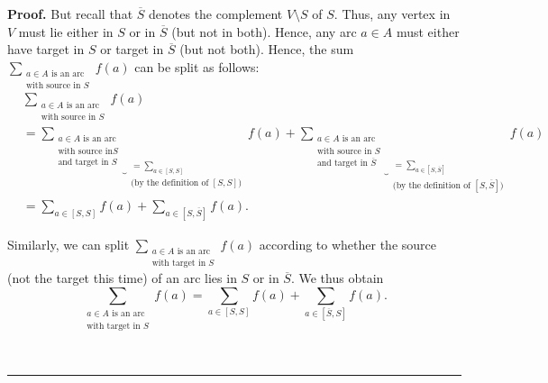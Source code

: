 \documentclass[numbers=enddot,12pt,final,onecolumn,notitlepage]{scrartcl}%
\theoremstyle{definition}
\newenvironment{proof}[1][Proof]{\noindent\textbf{#1.} }{\ \rule{0.5em}{0.5em}}
\let\sumnonlimits\sum
\renewcommand{\sum}{\sumnonlimits\limits}
\begin{document}
\begin{proof}
But recall that $\overline{S}$ denotes the complement $V\setminus S$ of $S$.
Thus, any vertex in $V$ must lie either in $S$ or in $\overline{S}$ (but not
in both). Hence, any arc $a\in A$ must either have target in $S$ or target in
$\overline{S}$ (but not both). Hence, the sum $\sum_{\substack{a\in A\text{ is
an arc}\\\text{with source in }S}}f\left(  a\right)  $ can be split as
follows:
\begin{align}
&  \sum_{\substack{a\in A\text{ is an arc}\\\text{with source in }S}}f\left(
a\right) \nonumber\\
&  =\underbrace{\sum_{\substack{a\in A\text{ is an arc}\\\text{with source in
}S\\\text{and target in }S}}}_{\substack{=\sum_{a\in\left[  S,S\right]
}\\\text{(by the definition of }\left[  S,S\right]  \text{)}}}f\left(
a\right)  +\underbrace{\sum_{\substack{a\in A\text{ is an arc}\\\text{with
source in }S\\\text{and target in }\overline{S}}}}_{\substack{=\sum
_{a\in\left[  S,\overline{S}\right]  }\\\text{(by the definition of }\left[
S,\overline{S}\right]  \text{)}}}f\left(  a\right) \nonumber\\
&  =\sum_{a\in\left[  S,S\right]  }f\left(  a\right)  +\sum_{a\in\left[
S,\overline{S}\right]  }f\left(  a\right)  . \label{pf.prop.2.a.2}%
\end{align}


Similarly, we can split $\sum_{\substack{a\in A\text{ is an arc}\\\text{with
target in }S}}f\left(  a\right)  $ according to whether the source (not the
target this time) of an arc lies in $S$ or in $\overline{S}$. We thus obtain%
\begin{equation}
\sum_{\substack{a\in A\text{ is an arc}\\\text{with target in }S}}f\left(
a\right)  =\sum_{a\in\left[  S,S\right]  }f\left(  a\right)  +\sum
_{a\in\left[  \overline{S},S\right]  }f\left(  a\right)  .
\label{pf.prop.2.a.3}%
\end{equation}



\end{proof}
\end{document}
